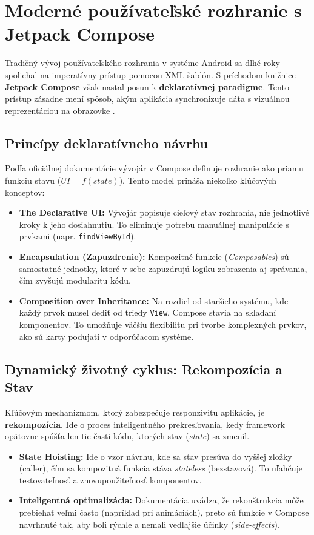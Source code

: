 \section{Moderné používateľské rozhranie s Jetpack Compose}
Tradičný vývoj používateľského rozhrania v systéme Android sa dlhé roky spoliehal na imperatívny prístup pomocou XML šablón. S príchodom knižnice \textbf{Jetpack Compose} však nastal posun k \textbf{deklaratívnej paradigme}. Tento prístup zásadne mení spôsob, akým aplikácia synchronizuje dáta s vizuálnou reprezentáciou na obrazovke \cite{android_compose_docs}.

\subsection{Princípy deklaratívneho návrhu}
Podľa oficiálnej dokumentácie vývojár v Compose definuje rozhranie ako priamu funkciu stavu ($UI = f(state)$). Tento model prináša niekoľko kľúčových konceptov:

\begin{itemize}
    \item \textbf{The Declarative UI:} Vývojár popisuje cieľový stav rozhrania, nie jednotlivé kroky k jeho dosiahnutiu. To eliminuje potrebu manuálnej manipulácie s prvkami (napr. \texttt{findViewById}).
    \item \textbf{Encapsulation (Zapuzdrenie):} Kompozitné funkcie (\textit{Composables}) sú samostatné jednotky, ktoré v sebe zapuzdrujú logiku zobrazenia aj správania, čím zvyšujú modularitu kódu.
    \item \textbf{Composition over Inheritance:} Na rozdiel od staršieho systému, kde každý prvok musel dediť od triedy \texttt{View}, Compose stavia na skladaní komponentov. To umožňuje väčšiu flexibilitu pri tvorbe komplexných prvkov, ako sú karty podujatí v odporúčacom systéme.
\end{itemize}

\subsection{Dynamický životný cyklus: Rekompozícia a Stav}
Kľúčovým mechanizmom, ktorý zabezpečuje responzivitu aplikácie, je \textbf{rekompozícia}. Ide o proces inteligentného prekresľovania, kedy framework opätovne spúšťa len tie časti kódu, ktorých stav (\textit{state}) sa zmenil.

\begin{itemize}
    \item \textbf{State Hoisting:} Ide o vzor návrhu, kde sa stav presúva do vyššej zložky (caller), čím sa kompozitná funkcia stáva \textit{stateless} (bezstavová). To uľahčuje testovateľnosť a znovupoužiteľnosť komponentov.
    \item \textbf{Inteligentná optimalizácia:} Dokumentácia uvádza, že rekonštrukcia môže prebiehať veľmi často (napríklad pri animáciách), preto sú funkcie v Compose navrhnuté tak, aby boli rýchle a nemali vedľajšie účinky (\textit{side-effects}).
\end{itemize}



